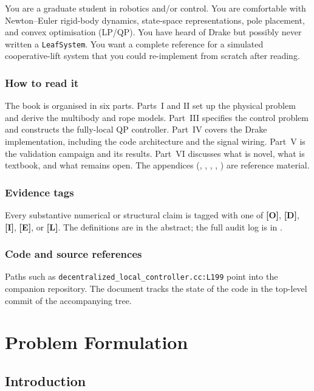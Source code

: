 \documentclass[11pt,a4paper,oneside]{report}
\newcommand{\Obs}{\textcolor{green!50!black}{\textbf{[O]}}}
\newcommand{\Der}{\textcolor{blue!60!black}{\textbf{[D]}}}
\newcommand{\Inf}{\textcolor{orange!70!black}{\textbf{[I]}}}
\newcommand{\Emp}{\textcolor{purple!60!black}{\textbf{[E]}}}
\newcommand{\Lim}{\textcolor{red!60!black}{\textbf{[L]}}}
\begin{document}
You are a graduate student in robotics and/or control. You are
comfortable with Newton--Euler rigid-body dynamics, state-space
representations, pole placement, and convex optimisation (LP/QP). You
have heard of Drake but possibly never written a \texttt{LeafSystem}.
You want a complete reference for a simulated cooperative-lift
system that you could re-implement from scratch after reading.

\section*{How to read it}

The book is organised in six parts. Parts~I and II set up the
physical problem and derive the multibody and rope models. Part~III
specifies the control problem and constructs the fully-local QP
controller. Part~IV covers the Drake implementation, including the
code architecture and the signal wiring. Part~V is the validation
campaign and its results. Part~VI discusses what is novel, what is
textbook, and what remains open. The appendices (,
, , ,
) are reference material.

\section*{Evidence tags}

Every substantive numerical or structural claim is tagged with one of
\Obs, \Der, \Inf, \Emp, or \Lim. The definitions are in the abstract;
the full audit log is in .

\section*{Code and source references}

Paths such as
\texttt{decentralized\_local\_controller.cc:L199} point into the
companion repository. The document tracks the state of the code in
the top-level commit of the accompanying tree.

\part{Problem Formulation}

\chapter{Introduction}
\label{chap:intro}
\end{document}
